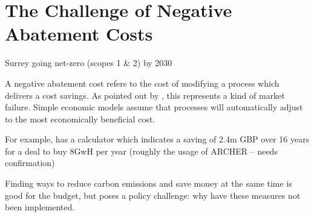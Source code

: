\documentclass[11pt]{article}
\begin{document}
\section{The Challenge of Negative Abatement Costs}

Surrey going net-zero (scopes 1 \& 2) by 2030\cite{oflynn2021}

A negative abatement cost refers to the cost of modifying a process which delivers a cost savings. As pointed out by \cite{elkins2011}, this represents a kind of market failure. Simple economic models assume that processes will automatically adjust to the most economically beneficial cost. 

For example, \cite{ukse-site} has a calculator which indicates a saving of 2.4m GBP over 16 years for a deal to buy 8GwH per year (roughly the usage of ARCHER -- needs confirmation)

Finding ways to reduce carbon emissions and save money at the same time is good for the budget, but poses a policy challenge: why have these measures not been implemented.

\printbibliography
\end{document}
